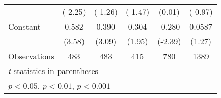 {\begin{tabular}{l*{5}{c}}
                &  (-2.25)         &  (-1.26)         &  (-1.47)         &   (0.01)         &  (-0.97)         \\
[1em]
Constant        &    0.582\sym{***}&    0.390\sym{**} &    0.304         &   -0.280\sym{*}  &   0.0587         \\
                &   (3.58)         &   (3.09)         &   (1.95)         &  (-2.39)         &   (1.27)         \\
\hline
Observations    &      483         &      483         &      415         &      780         &     1389         \\
\hline\hline
\multicolumn{6}{l}{\footnotesize \textit{t} statistics in parentheses}\\
\multicolumn{6}{l}{\footnotesize \sym{*} \(p<0.05\), \sym{**} \(p<0.01\), \sym{***} \(p<0.001\)}\\
\end{tabular}
}
